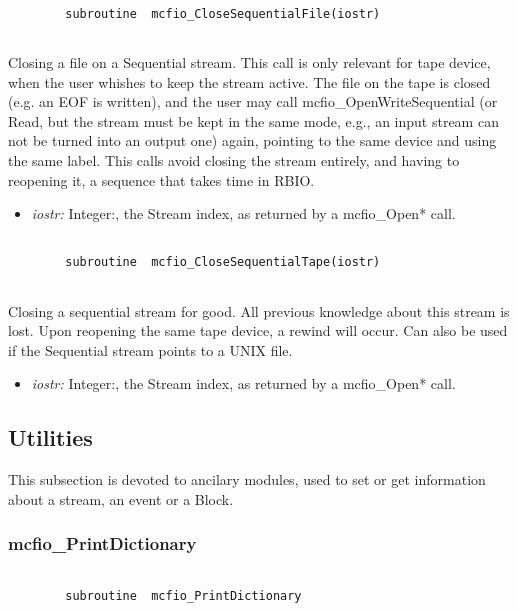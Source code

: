 \begin{verbatim}

        subroutine  mcfio_CloseSequentialFile(iostr)
    
\end{verbatim}

Closing a file on a Sequential stream. This call is only relevant for 
tape device, when the user whishes to keep the stream active. The file 
on the tape is closed (e.g. an EOF is written), and the user may call 
mcfio\_OpenWriteSequential (or Read, but the stream must be kept in the 
same mode, e.g., an input stream can not be turned into an output one) again,
pointing to the same device and using the same label. This calls avoid 
closing the stream entirely, and having to reopening it, a sequence 
that takes time in RBIO. 
\begin{itemize} 
\item {\em iostr:} Integer:, the Stream index, as returned by a mcfio\_Open* 
call.
\end{itemize}

\begin{verbatim}

        subroutine  mcfio_CloseSequentialTape(iostr)
    
\end{verbatim}

Closing a sequential stream for good. All previous knowledge 
about this stream is lost.  Upon reopening the same tape device, a rewind will 
occur. Can also be used if the Sequential stream points to a UNIX file.  
\begin{itemize} 
\item {\em iostr:} Integer:, the Stream index, as returned by a mcfio\_Open* 
call. 
\end{itemize}

\subsection{Utilities}

	This subsection is devoted to ancilary modules, used to set or get 
information about a stream, an event or a Block. 

\subsubsection{mcfio\_PrintDictionary}

\begin{verbatim}

        subroutine  mcfio_PrintDictionary
    
\end{verbatim}

